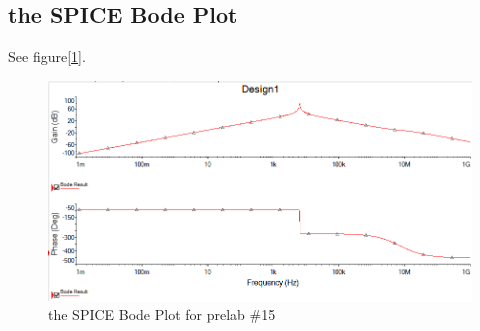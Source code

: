 \documentclass{IEEEtran}
\begin{document}
	\subsection{the SPICE Bode Plot}
	See figure[\ref{fig:1502}].
	\begin{figure}[!htbp]
		\centering
		\begin{framed}
			\includegraphics[width=\linewidth]{images/15_1.PNG}
			\caption{the SPICE Bode Plot for prelab \#15}
			\label{fig:1502}
		\end{framed}
	\end{figure}
\end{document}
